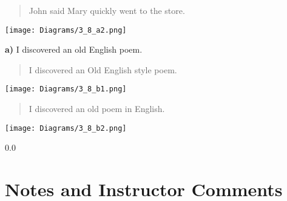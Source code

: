 \documentclass[11pt,notitlepage]{article}
\newcommand{\subquestion}[2]{\par\hspace{0.5cm} \textbf{#1)} #2}
\begin{document}
\begin{quote}John said Mary quickly went to the store.\end{quote}

    \texttt{[image: Diagrams/3\_8\_a2.png]}

\subquestion{a}{I discovered an old English poem.}

\begin{quote}I discovered an Old English style poem.\end{quote}

 \texttt{[image: Diagrams/3\_8\_b1.png]}
 
\begin{quote}I discovered an old poem in English.\end{quote}

   \texttt{[image: Diagrams/3\_8\_b2.png]}

\newpage
  {\setlength{\baselineskip}%
           {0.0\baselineskip}
  \section*{Notes and Instructor Comments}
  \hrulefill \par}
\end{document}
